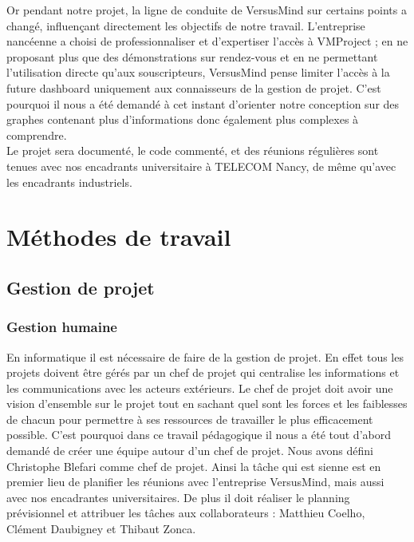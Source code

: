 \documentclass[12pt]{report}
\begin{document}
Or pendant notre projet, la ligne de conduite de VersusMind sur certains points a changé, influençant directement les objectifs de notre travail. L’entreprise nancéenne  a choisi de professionnaliser et d’expertiser l’accès à VMProject ; en ne proposant plus que des démonstrations sur rendez-vous et en ne permettant l’utilisation directe qu’aux souscripteurs, VersusMind pense limiter l’accès à la future dashboard uniquement aux connaisseurs de la gestion de projet. C’est pourquoi il nous a été demandé à cet instant d’orienter notre conception sur des graphes contenant plus d’informations donc également plus complexes à comprendre. \\

Le projet sera documenté, le code commenté, et des réunions régulières sont tenues avec nos encadrants universitaire à TELECOM Nancy, de même qu’avec les encadrants industriels.\\

\chapter{Méthodes de travail}

	\section{Gestion de projet}
		\subsection{Gestion humaine}
		
En informatique il est nécessaire de faire de la gestion de projet. En effet tous les projets doivent être gérés par un chef de projet qui centralise les informations et les communications avec les acteurs extérieurs. Le chef de projet doit avoir une vision d’ensemble sur le projet tout en sachant quel sont les forces et les faiblesses de chacun pour permettre à ses ressources de travailler le plus efficacement possible. C’est pourquoi dans ce travail pédagogique il nous a été tout d’abord demandé de créer une équipe autour d’un chef de projet. Nous avons défini Christophe Blefari comme chef de projet. Ainsi la tâche qui est sienne est en premier lieu de planifier les réunions avec l’entreprise VersusMind, mais aussi avec nos encadrantes universitaires. De plus il doit réaliser le planning prévisionnel et attribuer les tâches aux collaborateurs : Matthieu Coelho, Clément Daubigney et Thibaut Zonca.\\
\end{document}
